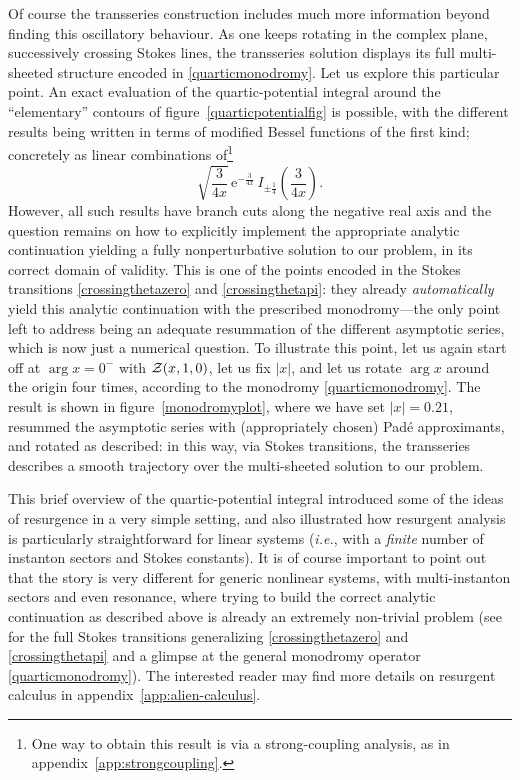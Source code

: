 \documentclass[11pt,a4paper]{article}
\newcommand{\CZ}{{\cal Z}}
\newcommand{\be}{\begin{equation}}
\newcommand{\ee}{\end{equation}}
\newcommand{\rme}{{\mathrm{e}}}
\begin{document}
Of course the transseries construction includes much more information beyond finding this oscillatory behaviour. As one keeps rotating in the complex plane, successively crossing Stokes lines, the transseries solution displays its full multi-sheeted structure encoded in \eqref{quarticmonodromy}. Let us explore this particular point. An exact evaluation of the quartic-potential integral around the ``elementary'' contours of figure~\ref{quarticpotentialfig} is possible, with the different results being written in terms of modified Bessel functions of the first kind; concretely as linear combinations of\footnote{One way to obtain this result is via a strong-coupling analysis, as in appendix~\ref{app:strongcoupling}.}
%
\be
\label{bessel-mentioned}
\sqrt{\frac{3}{4x}}\, \rme^{-\frac{3}{4x}}\, I_{\pm \frac{1}{4}} \left( \frac{3}{4x} \right).
\ee
%
\noindent
However, all such results have branch cuts along the negative real axis and the question remains on how to explicitly implement the appropriate analytic continuation yielding a fully nonperturbative solution to our problem, in its correct domain of validity. This is one of the points encoded in the Stokes transitions \eqref{crossingthetazero} and \eqref{crossingthetapi}: they already \textit{automatically} yield this analytic continuation with the prescribed monodromy---the only point left to address being an adequate resummation of the different asymptotic series, which is now just a numerical question. To illustrate this point, let us again start off at $\arg x = 0^-$ with $\CZ (x, 1, 0)$, let us fix $|x|$, and let us rotate $\arg x$ around the origin four times, according to the monodromy \eqref{quarticmonodromy}. The result is shown in figure~\ref{monodromyplot}, where we have set $|x|=0.21$, resummed the asymptotic series with (appropriately chosen) Pad\'e approximants, and rotated as described: in this way, via Stokes transitions, the transseries describes a smooth trajectory over the multi-sheeted solution to our problem.

This brief overview of the quartic-potential integral introduced some of the ideas of resurgence in a very simple setting, and also illustrated how resurgent analysis is particularly straightforward for linear systems (\textit{i.e.}, with a \textit{finite} number of instanton sectors and Stokes constants). It is of course important to point out that the story is very different for generic nonlinear systems, with multi-instanton sectors and even resonance, where trying to build the correct analytic continuation as described above is already an extremely non-trivial problem (see \cite{as13} for the full Stokes transitions generalizing \eqref{crossingthetazero} and \eqref{crossingthetapi} and a glimpse at the general monodromy operator \eqref{quarticmonodromy}). The interested reader may find more details on resurgent calculus in appendix~\ref{app:alien-calculus}.
\end{document}
